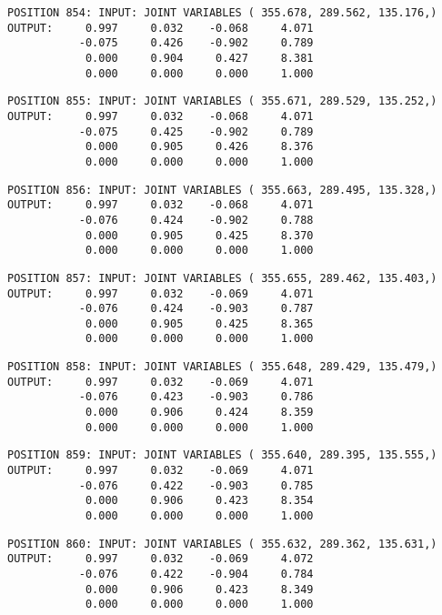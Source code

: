\begin{verbatim}
POSITION 854: INPUT: JOINT VARIABLES ( 355.678, 289.562, 135.176,)
OUTPUT:     0.997     0.032    -0.068     4.071
           -0.075     0.426    -0.902     0.789
            0.000     0.904     0.427     8.381
            0.000     0.000     0.000     1.000
\end{verbatim} \pagebreak[1]\begin{verbatim}
POSITION 855: INPUT: JOINT VARIABLES ( 355.671, 289.529, 135.252,)
OUTPUT:     0.997     0.032    -0.068     4.071
           -0.075     0.425    -0.902     0.789
            0.000     0.905     0.426     8.376
            0.000     0.000     0.000     1.000
\end{verbatim} \pagebreak[1]\begin{verbatim}
POSITION 856: INPUT: JOINT VARIABLES ( 355.663, 289.495, 135.328,)
OUTPUT:     0.997     0.032    -0.068     4.071
           -0.076     0.424    -0.902     0.788
            0.000     0.905     0.425     8.370
            0.000     0.000     0.000     1.000
\end{verbatim} \pagebreak[1]\begin{verbatim}
POSITION 857: INPUT: JOINT VARIABLES ( 355.655, 289.462, 135.403,)
OUTPUT:     0.997     0.032    -0.069     4.071
           -0.076     0.424    -0.903     0.787
            0.000     0.905     0.425     8.365
            0.000     0.000     0.000     1.000
\end{verbatim} \pagebreak[1]\begin{verbatim}
POSITION 858: INPUT: JOINT VARIABLES ( 355.648, 289.429, 135.479,)
OUTPUT:     0.997     0.032    -0.069     4.071
           -0.076     0.423    -0.903     0.786
            0.000     0.906     0.424     8.359
            0.000     0.000     0.000     1.000
\end{verbatim} \pagebreak[1]\begin{verbatim}
POSITION 859: INPUT: JOINT VARIABLES ( 355.640, 289.395, 135.555,)
OUTPUT:     0.997     0.032    -0.069     4.071
           -0.076     0.422    -0.903     0.785
            0.000     0.906     0.423     8.354
            0.000     0.000     0.000     1.000
\end{verbatim} \pagebreak[1]\begin{verbatim}
POSITION 860: INPUT: JOINT VARIABLES ( 355.632, 289.362, 135.631,)
OUTPUT:     0.997     0.032    -0.069     4.072
           -0.076     0.422    -0.904     0.784
            0.000     0.906     0.423     8.349
            0.000     0.000     0.000     1.000
\end{verbatim} \pagebreak[1]\begin{verbatim}

\end{verbatim}
